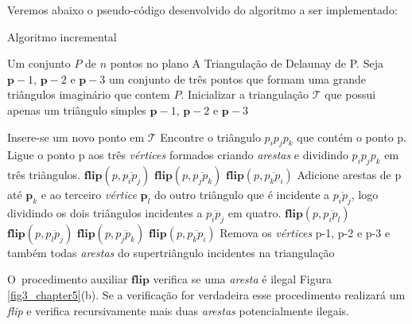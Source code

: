 \documentclass[12pt,a4paper]{book}
\begin{document}
Veremos abaixo o pseudo-c\'{o}digo desenvolvido do algoritmo a ser
implementado:

\begin{algorithm}
\caption{Algoritmo incremental}
\label{watson}
\begin{algorithmic}
\REQUIRE Um conjunto $P$ de $n$ pontos no plano
\ENSURE A Triangula\c{c}\~{a}o de Delaunay de P.
Seja ${\mathbf p}-1$, ${\mathbf p}-2$ e ${\mathbf p}-3$ um conjunto de tr\^{e}s pontos que formam uma grande tri\^{a}ngulos imagin\'{a}rio que contem $P$.
Inicializar a triangula\c{c}\~{a}o $\mathcal{T}$ que possui apenas um tri\^{a}ngulo simples
${\mathbf p}-1$, ${\mathbf p}-2$ e ${\mathbf p}-3$

\STATE  Insere-se um novo ponto em $\mathcal{T}$
\STATE  Encontre o tri\^{a}ngulo ${p}_{i}{p}_{j}{p}_{k}$ que cont\'{e}m o ponto p.
\STATE Ligue o ponto p aos tr\^{e}s \textit{v\'{e}rtices} formados criando \textit{arestas} e dividindo 
${p}_{i}{p}_{j}{p}_{k}$ em tr\^{e}s tri\^{a}ngulos.
\STATE $\mathbf{flip}\left( p,\overline{p_{i}p_{j}}\right)$
\STATE $\mathbf{flip}\left( p,\overline{p_{j}p_{k}}\right)$
\STATE $\mathbf{flip}\left( p,\overline{p_{k}p_{i}}\right)$
\ELSE 
\STATE Adicione arestas de p at\'{e} $\mathbf{p}_{k}$ e ao terceiro \textit{v\'{e}rtice} $\mathbf{p}_{l}$ 
\STATE do outro tri\^{a}ngulo que \'{e} incidente a $\overline{p_{i}p_{j}}$, logo dividindo os dois 
\STATE tri\^{a}ngulos incidentes a $\overline{p_{i}p_{j}}$ em quatro.
\STATE $\mathbf{flip}\left( p,\overline{p_{i}p_{l}}\right)$
\STATE $\mathbf{flip}\left( p,\overline{p_{l}p_{j}}\right)$
\STATE $\mathbf{flip}\left( p,\overline{p_{j}p_{k}}\right)$
\STATE $\mathbf{flip}\left( p,\overline{p_{k}p_{i}}\right)$
\ENDIF
\ENDFOR
\STATE Remova os \textit{v\'{e}rtices} p-1, p-2 e p-3 e tamb\'{e}m todas \textit{arestas} 
\STATE do supertri\^{a}ngulo incidentes na triangula\c{c}\~{a}o 
\end{algorithmic}
\end{algorithm}


O\ procedimento auxiliar $\mathbf{flip}$ verifica se uma \textit{aresta}
\'{e} ilegal Figura \ref{fig3_chapter5}(b). Se a verifica\c{c}\~{a}o for
verdadeira esse procedimento realizar\'{a} um \textit{flip} e verifica recursivamente
mais duas \textit{arestas} potencialmente ilegais.
\end{document}
